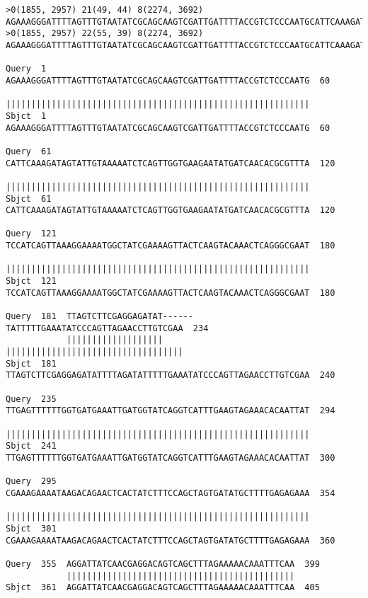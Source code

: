 \documentclass{article}[12pt]
\begin{document}
\begin{verbatim}
>0(1855, 2957) 21(49, 44) 8(2274, 3692) 
AGAAAGGGATTTTAGTTTGTAATATCGCAGCAAGTCGATTGATTTTACCGTCTCCCAATGCATTCAAAGATAGTATTGTAAAAATCTCAGTTGGTGAAGAATATGATCAACACGCGTTTATCCATCAGTTAAAGGAAAATGGCTATCGAAAAGTTACTCAAGTACAAACTCAGGGCGAATTTAGTCTTCGAGGAGATATTATTTTTGAAATATCCCAGTTAGAACCTTGTCGAATTGAGTTTTTTGGTGATGAAATTGATGGTATCAGGTCATTTGAAGTAGAAACACAATTATCGAAAGAAAATAAGACAGAACTCACTATCTTTCCAGCTAGTGATATGCTTTTGAGAGAAAAGGATTATCAACGAGGACAGTCAGCTTTAGAAAAACAAATTTCAA
>0(1855, 2957) 22(55, 39) 8(2274, 3692) 
AGAAAGGGATTTTAGTTTGTAATATCGCAGCAAGTCGATTGATTTTACCGTCTCCCAATGCATTCAAAGATAGTATTGTAAAAATCTCAGTTGGTGAAGAATATGATCAACACGCGTTTATCCATCAGTTAAAGGAAAATGGCTATCGAAAAGTTACTCAAGTACAAACTCAGGGCGAATTTAGTCTTCGAGGAGATATTTTAGATATTTTTGAAATATCCCAGTTAGAACCTTGTCGAATTGAGTTTTTTGGTGATGAAATTGATGGTATCAGGTCATTTGAAGTAGAAACACAATTATCGAAAGAAAATAAGACAGAACTCACTATCTTTCCAGCTAGTGATATGCTTTTGAGAGAAAAGGATTATCAACGAGGACAGTCAGCTTTAGAAAAACAAATTTCAA

Query  1    AGAAAGGGATTTTAGTTTGTAATATCGCAGCAAGTCGATTGATTTTACCGTCTCCCAATG  60
            ||||||||||||||||||||||||||||||||||||||||||||||||||||||||||||
Sbjct  1    AGAAAGGGATTTTAGTTTGTAATATCGCAGCAAGTCGATTGATTTTACCGTCTCCCAATG  60

Query  61   CATTCAAAGATAGTATTGTAAAAATCTCAGTTGGTGAAGAATATGATCAACACGCGTTTA  120
            ||||||||||||||||||||||||||||||||||||||||||||||||||||||||||||
Sbjct  61   CATTCAAAGATAGTATTGTAAAAATCTCAGTTGGTGAAGAATATGATCAACACGCGTTTA  120

Query  121  TCCATCAGTTAAAGGAAAATGGCTATCGAAAAGTTACTCAAGTACAAACTCAGGGCGAAT  180
            ||||||||||||||||||||||||||||||||||||||||||||||||||||||||||||
Sbjct  121  TCCATCAGTTAAAGGAAAATGGCTATCGAAAAGTTACTCAAGTACAAACTCAGGGCGAAT  180

Query  181  TTAGTCTTCGAGGAGATAT------TATTTTTGAAATATCCCAGTTAGAACCTTGTCGAA  234
            |||||||||||||||||||      |||||||||||||||||||||||||||||||||||
Sbjct  181  TTAGTCTTCGAGGAGATATTTTAGATATTTTTGAAATATCCCAGTTAGAACCTTGTCGAA  240

Query  235  TTGAGTTTTTTGGTGATGAAATTGATGGTATCAGGTCATTTGAAGTAGAAACACAATTAT  294
            ||||||||||||||||||||||||||||||||||||||||||||||||||||||||||||
Sbjct  241  TTGAGTTTTTTGGTGATGAAATTGATGGTATCAGGTCATTTGAAGTAGAAACACAATTAT  300

Query  295  CGAAAGAAAATAAGACAGAACTCACTATCTTTCCAGCTAGTGATATGCTTTTGAGAGAAA  354
            ||||||||||||||||||||||||||||||||||||||||||||||||||||||||||||
Sbjct  301  CGAAAGAAAATAAGACAGAACTCACTATCTTTCCAGCTAGTGATATGCTTTTGAGAGAAA  360

Query  355  AGGATTATCAACGAGGACAGTCAGCTTTAGAAAAACAAATTTCAA  399
            |||||||||||||||||||||||||||||||||||||||||||||
Sbjct  361  AGGATTATCAACGAGGACAGTCAGCTTTAGAAAAACAAATTTCAA  405

\end{verbatim}
\end{document}
